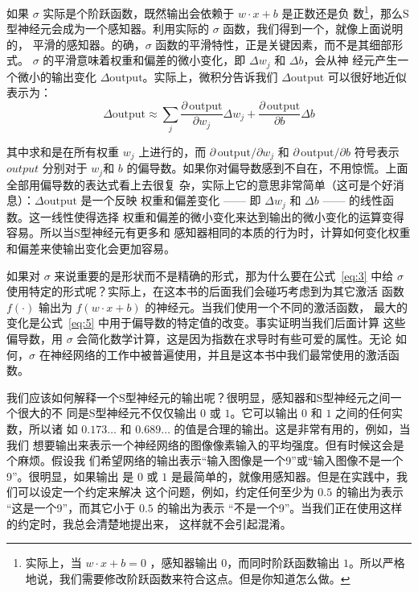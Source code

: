 如果 $\sigma$ 实际是个阶跃函数，既然输出会依赖于 $w\cdot x+b$ 是正数还是负
数\footnote{实际上，当 $w \cdot x +b = 0$ ，感知器输出 $0$，而同时阶跃函数输出
  $1$。所以严格地说，我们需要修改阶跃函数来符合这点。但是你知道怎么做。}，那么S
型神经元会成为一个感知器。利用实际的 $\sigma$ 函数，我们得到一个，就像上面说明的，
平滑的感知器。的确，$\sigma$ 函数的平滑特性，正是关键因素，而不是其细部形式。
$\sigma$ 的平滑意味着权重和偏差的微小变化，即 $\Delta w_j$ 和 $\Delta b$，会从神
经元产生一个微小的输出变化 $\Delta \mbox{output}$。实际上，微积分告诉我们
$\Delta \mbox{output}$ 可以很好地近似表示为：
\begin{equation}
  \Delta \mbox{output} \approx \sum_j \frac{\partial \, \mbox{output}}{\partial w_j}
  \Delta w_j + \frac{\partial \, \mbox{output}}{\partial b} \Delta b
  \label{eq:5}\tag{5}
\end{equation}

其中求和是在所有权重 $w_j$ 上进行的，而 $\partial \, \mbox{output} / \partial w_j$ 和
$\partial \, \mbox{output} /\partial b$ 符号表示 $output$ 分别对于 $w_j$和 $b$
的偏导数。如果你对偏导数感到不自在，不用惊慌。上面全部用偏导数的表达式看上去很复
杂，实际上它的意思非常简单（这可是个好消息）：$\Delta \mbox{output}$ 是一个反映
权重和偏差变化 —— 即 $\Delta w_j$ 和 $\Delta b$ —— 的线性函数。这一线性使得选择
权重和偏差的微小变化来达到输出的微小变化的运算变得容易。所以当S型神经元有更多和
感知器相同的本质的行为时，计算如何变化权重和偏差来使输出变化会更加容易。

如果对 $\sigma$ 来说重要的是形状而不是精确的形式，那为什么要在公式~\eqref{eq:3}
中给 $\sigma$ 使用特定的形式呢？实际上，在这本书的后面我们会碰巧考虑到为其它激活
函数 $f(\cdot)$ 输出为 $f(w \cdot x + b)$ 的神经元。当我们使用一个不同的激活函数，
最大的变化是公式~\eqref{eq:5} 中用于偏导数的特定值的改变。事实证明当我们后面计算
这些偏导数，用 $\sigma$ 会简化数学计算，这是因为指数在求导时有些可爱的属性。无论
如何，$\sigma$ 在神经网络的工作中被普遍使用，并且是这本书中我们最常使用的激活函
数。

我们应该如何解释一个S型神经元的输出呢？很明显，感知器和S型神经元之间一个很大的不
同是S型神经元不仅仅输出 $0$ 或 $1$。它可以输出 $0$ 和 $1$ 之间的任何实数，所以诸
如 $0.173\ldots$ 和 $0.689\ldots$ 的值是合理的输出。这是非常有用的，例如，当我们
想要输出来表示一个神经网络的图像像素输入的平均强度。但有时候这会是个麻烦。假设我
们希望网络的输出表示``输入图像是一个9''或``输入图像不是一个9''。很明显，如果输出
是 $0$ 或 $1$ 是最简单的，就像用感知器。但是在实践中，我们可以设定一个约定来解决
这个问题，例如，约定任何至少为 $0.5$ 的输出为表示 ``这是一个9''，而其它小于
$0.5$ 的输出为表示 ``不是一个9''。当我们正在使用这样的约定时，我总会清楚地提出来，
这样就不会引起混淆。

